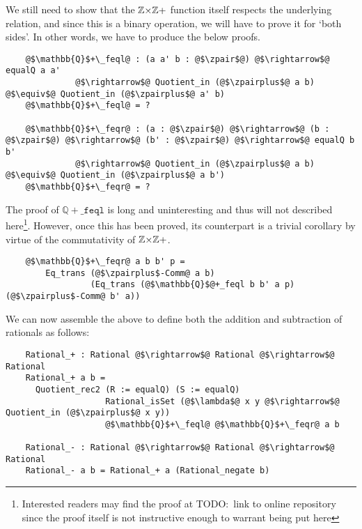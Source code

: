 \documentclass[12pt,twoside,maitrise]{dms}
\theoremstyle{definition}
\numberwithin{equation}{section}
\numberwithin{table}{chapter}
\numberwithin{figure}{chapter}
\newcommand\id[1] {\texttt{#1}}
\begin{document}
We still need to show that the $\mathbb{Z}{\times}\mathbb{Z}+$ function itself respects the
underlying relation, and since this is a binary operation, we will have to prove
it for `both sides'. In other words, we have to produce the below proofs.

\begin{verbatim}
    @$\mathbb{Q}$+\_feql@ : (a a' b : @$\zpair$@) @$\rightarrow$@ equalQ a a'
              @$\rightarrow$@ Quotient_in (@$\zpairplus$@ a b) @$\equiv$@ Quotient_in (@$\zpairplus$@ a' b)
    @$\mathbb{Q}$+\_feql@ = ?

    @$\mathbb{Q}$+\_feqr@ : (a : @$\zpair$@) @$\rightarrow$@ (b : @$\zpair$@) @$\rightarrow$@ (b' : @$\zpair$@) @$\rightarrow$@ equalQ b b'
              @$\rightarrow$@ Quotient_in (@$\zpairplus$@ a b) @$\equiv$@ Quotient_in (@$\zpairplus$@ a b')
    @$\mathbb{Q}$+\_feqr@ = ?
\end{verbatim}

The proof of $\mathbb{Q}{+}\_\id{feql}$ is long and uninteresting and thus will
not described here\footnote{Interested readers may find the proof at TODO:\ link
to online repository since the proof itself is not instructive enough to
warrant being put here}. However, once this has been proved, its counterpart is
a trivial corollary by virtue of the commutativity of $\mathbb{Z}{\times}\mathbb{Z}+$.

\begin{verbatim}
    @$\mathbb{Q}$+\_feqr@ a b b' p =
        Eq_trans (@$\zpairplus$-Comm@ a b)
                 (Eq_trans (@$\mathbb{Q}$@+_feql b b' a p) (@$\zpairplus$-Comm@ b' a))
\end{verbatim}

We can now assemble the above to define both the addition and subtraction of
rationals as follows:

\begin{verbatim}
    Rational_+ : Rational @$\rightarrow$@ Rational @$\rightarrow$@ Rational
    Rational_+ a b =
      Quotient_rec2 (R := equalQ) (S := equalQ)
                    Rational_isSet (@$\lambda$@ x y @$\rightarrow$@ Quotient_in (@$\zpairplus$@ x y))
                    @$\mathbb{Q}$+\_feql@ @$\mathbb{Q}$+\_feqr@ a b

    Rational_- : Rational @$\rightarrow$@ Rational @$\rightarrow$@ Rational
    Rational_- a b = Rational_+ a (Rational_negate b)
\end{verbatim}
\end{document}
